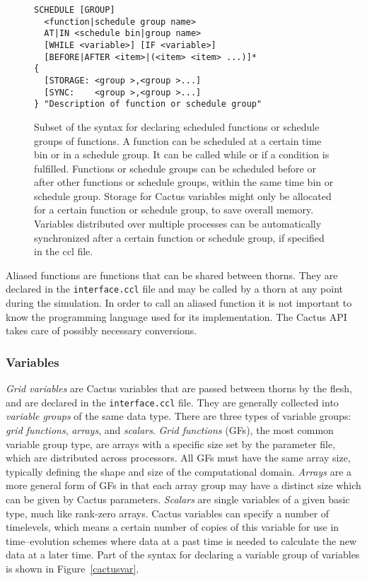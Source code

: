 \documentclass[conference]{IEEEtran}
\begin{document}
\begin{figure}[h!]
\centering
{\small
\begin{Verbatim}[frame=single, framerule=0.3mm]
SCHEDULE [GROUP] 
  <function|schedule group name> 
  AT|IN <schedule bin|group name> 
  [WHILE <variable>] [IF <variable>] 
  [BEFORE|AFTER <item>|(<item> <item> ...)]*
{
  [STORAGE: <group >,<group >...]
  [SYNC:    <group >,<group >...] 
} "Description of function or schedule group"
\end{Verbatim}
}
\caption{Subset of the syntax for declaring scheduled functions or schedule groups of functions.
A function can be scheduled at a certain time bin or in a schedule group.
It can be called while or if a condition is fulfilled. Functions or schedule groups can be
scheduled before or after other functions or schedule groups, within the same time bin or schedule group.
Storage for Cactus variables might only be allocated for a certain function or schedule group,
to save overall memory. Variables distributed over multiple processes can be automatically synchronized after a certain function or schedule group, if specified in the ccl file.
}
\label{cactusscheduling}
\end{figure}

Aliased functions are functions that can be shared between thorns. They are declared in the 
\texttt{interface.ccl} file and may be called by a thorn at any point during the simulation.
In order to call an aliased function it is not important to know the programming language used
for its implementation. The Cactus API takes care of possibly necessary conversions.


\subsubsection{Variables}
\label{sec:variables}
\emph{Grid variables} are Cactus variables that are passed between thorns by the flesh, and are declared in the \texttt{interface.ccl} file. 
They are generally collected into \emph{variable groups} of the same data type.
There are three types of variable groups: \emph{grid functions}, \emph{arrays}, and \emph{scalars}.
\emph{Grid functions} (GFs), the most common variable group type, are arrays with a specific size set by the
parameter file, which are distributed across processors. All GFs must have the same array size, typically defining the shape and size of the computational domain.
\emph{Arrays} are a more general form of GFs in that each array group may have a distinct size which
can be given by Cactus parameters. 
\emph{Scalars} are single variables of a given basic type, much like rank-zero arrays.
Cactus variables can specify a number of timelevels, which means a certain number
of copies of this variable for use in time--evolution schemes where data at a past time is needed to
calculate the new data at a later time.
Part of the syntax for declaring a variable group of variables is shown in Figure~\ref{cactusvar}.
\end{document}
